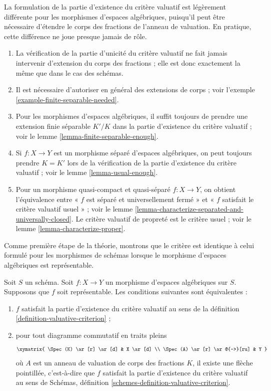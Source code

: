 \noindent
La formulation de la partie d'existence du critère valuatif est
légèrement différente pour les morphismes d'espaces algébriques, puisqu'il peut être
nécessaire d'étendre le corps des fractions de l'anneau de valuation.
En pratique, cette différence ne joue presque jamais de rôle.
\begin{enumerate}
\item La vérification de la partie d'unicité du critère valuatif ne
fait jamais intervenir d'extension du corps des fractions ; elle est donc exactement la même
que dans le cas des schémas.
\item Il est nécessaire d'autoriser en général des extensions de corps ; voir
l'exemple \ref{example-finite-separable-needed}.
\item Pour les morphismes d'espaces algébriques, il suffit toujours de
prendre une extension finie séparable $K'/K$ dans la partie d'existence
du critère valuatif ; voir le lemme \ref{lemma-finite-separable-enough}.
\item Si $f : X \to Y$ est un morphisme séparé d'espaces algébriques, on
peut toujours prendre $K = K'$ lors de la vérification de la partie d'existence du
critère valuatif ; voir le lemme \ref{lemma-usual-enough}.
\item Pour un morphisme quasi-compact et quasi-séparé
$f : X \to Y$, on obtient l'équivalence entre
« $f$ est séparé et universellement fermé » et « $f$ satisfait
le critère valuatif usuel » ; voir le
lemme \ref{lemma-characterize-separated-and-universally-closed}.
Le critère valuatif de propreté est le critère usuel ; voir le
lemme \ref{lemma-characterize-proper}.
\end{enumerate}
Comme première étape de la théorie, montrons que le critère est identique
à celui formulé pour les morphismes de schémas
lorsque le morphisme d'espaces algébriques est représentable.

\begin{lemma}
\label{lemma-valuative-criterion-representable}
Soit $S$ un schéma.
Soit $f : X \to Y$ un morphisme d'espaces algébriques sur $S$.
Supposons que $f$ soit représentable. Les conditions suivantes sont équivalentes :
\begin{enumerate}
\item $f$ satisfait la partie d'existence du critère valuatif
au sens de la définition \ref{definition-valuative-criterion} ;
\item pour tout diagramme commutatif en traits pleins
$$
\xymatrix{
\Spec(K) \ar[r] \ar[d] & X \ar[d] \\
\Spec(A) \ar[r] \ar@{-->}[ru] & Y
}
$$
où $A$ est un anneau de valuation de corps des fractions $K$, il existe
une flèche pointillée, c'est-à-dire que $f$ satisfait la partie d'existence du critère
valuatif au sens de
Schémas, définition \ref{schemes-definition-valuative-criterion}.
\end{enumerate}
\end{lemma}

